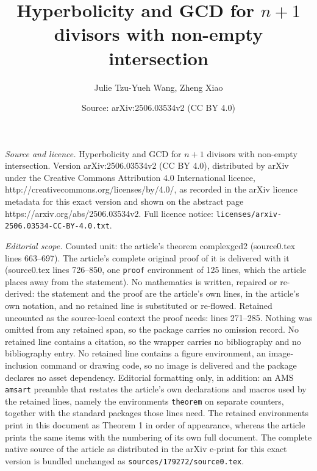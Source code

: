\documentclass[10pt,a4paper]{amsart}
\title{Hyperbolicity and GCD for $n+1$ divisors with non-empty intersection}
\author{Julie Tzu-Yueh Wang, Zheng Xiao}
\date{Source: arXiv:2506.03534v2 (CC BY 4.0)}
\begin{document}
\maketitle

\noindent\emph{Source and licence.} Hyperbolicity and GCD for $n+1$ divisors with non-empty intersection. Version arXiv:2506.03534v2 (CC BY 4.0), distributed by arXiv under the Creative Commons Attribution 4.0 International licence, http://creativecommons.org/licenses/by/4.0/, as recorded in the arXiv licence metadata for this exact version and shown on the abstract page https://arxiv.org/abs/2506.03534v2. Full licence notice: \texttt{licenses/arxiv-2506.03534-CC-BY-4.0.txt}.\par\smallskip

\noindent\textit{Editorial scope.} Counted unit: the article's theorem complexgcd2 (source0.tex lines 663--697). The article's complete original proof of it is delivered with it (source0.tex lines 726--850, one \texttt{proof} environment of 125 lines, which the article places away from the statement). No mathematics is written, repaired or re-derived: the statement and the proof are the article's own lines, in the article's own notation, and no retained line is substituted or re-flowed.  Retained uncounted as the source-local context the proof needs: lines 271--285.  Nothing was omitted from any retained span, so the package carries no omission record.  No retained line contains a citation, so the wrapper carries no bibliography and no bibliography entry.  No retained line contains a figure environment, an image-inclusion command or drawing code, so no image is delivered and the package declares no asset dependency.  Editorial formatting only, in addition: an AMS \texttt{amsart} preamble that restates the article's own declarations and macros used by the retained lines, namely the environments \texttt{theorem} on separate counters, together with the standard packages those lines need.  The retained environments print in this document as Theorem 1 in order of appearance, whereas the article prints the same items with the numbering of its own full document.  The complete native source of the article as distributed in the arXiv e-print for this exact version is bundled unchanged as \texttt{sources/179272/source0.tex}.
\end{document}
